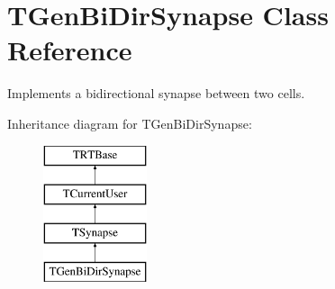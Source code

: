 \hypertarget{class_t_gen_bi_dir_synapse}{\section{T\+Gen\+Bi\+Dir\+Synapse Class Reference}
\label{class_t_gen_bi_dir_synapse}
}


Implements a bidirectional synapse between two cells.  


Inheritance diagram for T\+Gen\+Bi\+Dir\+Synapse\+:\begin{figure}[H]
\begin{center}
\leavevmode
\includegraphics[height=4.000000cm]{class_t_gen_bi_dir_synapse}
\end{center}
\end{figure}
